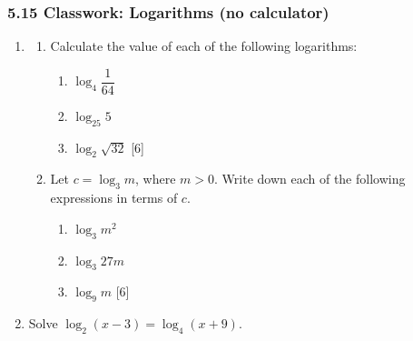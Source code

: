 \documentclass[12pt, twoside]{article}
\begin{document}
\subsubsection*{5.15 Classwork: Logarithms (no calculator)}

\begin{enumerate}[itemsep=0.15cm]

\item[1.] [Maximum mark: 12]

\begin{enumerate}[itemsep=0.2cm]
  \item Calculate the value of each of the following logarithms:
  \begin{enumerate}[itemsep=0.1cm, label=(\roman*)]
    \item $\log_4 \dfrac{1}{64}$
    \item $\log_{25} 5$
    \item $\log_2 \sqrt{32}$ \hfill [6]
  \end{enumerate}

  \item Let $c = \log_3 m$, where $m > 0$. Write down each of the
  following expressions in terms of $c$.
  \begin{enumerate}[itemsep=0.1cm, label=(\roman*)]
    \item $\log_3 m^2$
    \item $\log_3 27m$
    \item $\log_9 m$ \hfill [6]
  \end{enumerate}
\end{enumerate}


\newpage

\item[2.] [Maximum mark: 7]

Solve $\log_2(x - 3) = \log_4(x + 9)$.



\end{enumerate}
\end{document}
